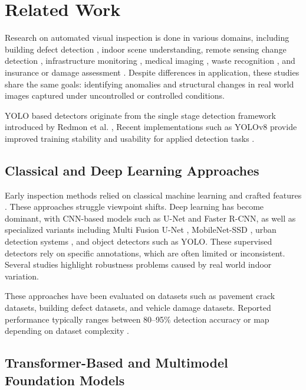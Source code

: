 \section{Related Work}
\label{sec:related_work}

Research on automated visual inspection is done in various domains, including building defect detection \cite{wen_autonomous_2024, kang_improvement_2025}, indoor scene understanding, remote sensing change detection \cite{cheng_change_2024}, infrastructure monitoring \cite{shang_automatic_2023}, medical imaging \cite{kamraoui_longitudinal_2022}, waste recognition \cite{malla_enhancing_2025}, and insurance or damage assessment \cite{lee_automated_2024}. Despite differences in application, these studies share the same goals: identifying anomalies and structural changes in real world images captured under uncontrolled or controlled conditions.

YOLO based detectors originate from the single stage detection framework introduced by Redmon et al. \cite{redmon_you_2016}, Recent implementations such as YOLOv8 provide improved training stability and usability for applied detection tasks \cite{jocher_ultralytics_2023}.

\subsection{Classical and Deep Learning Approaches}

Early inspection methods relied on classical machine learning and crafted features \cite{awe_towards_2025}. These approaches struggle viewpoint shifts. Deep learning has become dominant, with CNN-based models such as U-Net and Faster R-CNN, as well as specialized variants including Multi Fusion U-Net \cite{shang_automatic_2023}, MobileNet-SSD \cite{goncalves_deep_2023}, urban detection systems \cite{sukel_detecting_2020}, and object detectors such as YOLO. These supervised detectors rely on specific annotations, which are often limited or inconsistent. Several studies highlight robustness problems caused by real world indoor variation.

These approaches have been evaluated on datasets such as pavement crack datasets, building defect datasets, and vehicle damage datasets. Reported performance typically ranges between 80–95\% detection accuracy or map depending on dataset complexity \cite{lee_automated_2024, shang_automatic_2023}.

\subsection{Transformer-Based and Multimodel Foundation Models}

